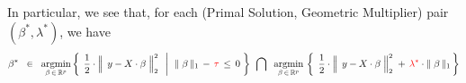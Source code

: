 In particular, we see that,
for each (Primal Solution, Geometric Multiplier) pair \,$(\beta^{*},\lambda^{*})$,
we have
\begin{equation*}
\beta^{*}
\;\; \in \;\;
	\underset{\beta\,\in\,\Re^{p}}{\argmin}
	\left\{\;
		\left.
		\dfrac{1}{2}
		\cdot
		\left\Vert\;\, y \overset{{\color{white}.}}{-} X\cdot\beta \;\right\Vert_{2}^{2}
		\;\;\,\right\vert\;\,
		\Vert\;\beta\,\Vert_{1} \, - \, {\color{red}\tau} \, \leq \, 0
		\;\right\}
	\;\,\bigcap\;\;
	\underset{\beta\,\in\,\Re^{p}}{\argmin}\,
	\left\{\;\,
		\dfrac{1}{2}
		\cdot
		\left\Vert\;\, y \overset{{\color{white}.}}{-} X\cdot\beta \;\right\Vert_{2}^{2}
		\; + \,
		{\color{red}\lambda^{*}} \cdot \Vert\;\beta\,\Vert_{1} 
		\,\right\}
\end{equation*}



\renewcommand{\theenumi}{\roman{enumi}}
\renewcommand{\labelenumi}{\textnormal{(\theenumi)}$\;\;$}

